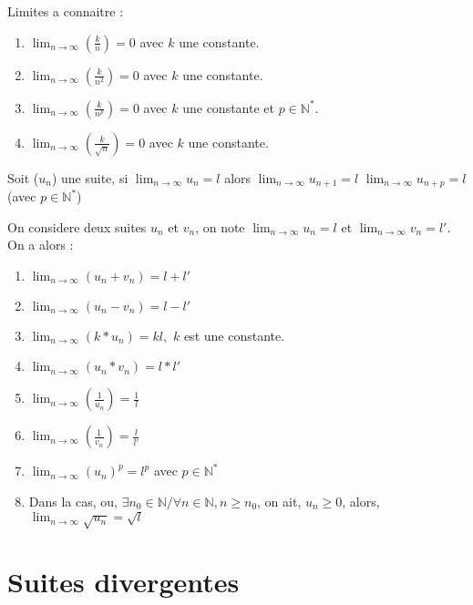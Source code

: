 \documentclass[a4paper,10pt]{book}
\begin{document}
	\begin{prop}
		Limites a connaitre : \\
		\begin{enumerate}
			\item $ \lim_{n \rightarrow \infty}(\frac{k}{n}) = 0$ avec $k$ une constante.
			\item $ \lim_{n \rightarrow \infty}(\frac{k}{n^2}) = 0$ avec $k$ une constante.
			\item $ \lim_{n \rightarrow \infty}(\frac{k}{n^p}) = 0$ avec $k$ une constante et $p \in \mathbb{N}^*$.
			\item $ \lim_{n \rightarrow \infty}(\frac{k}{\sqrt{n}}) = 0$ avec $k$ une constante.
		\end{enumerate}
	\end{prop}

	\begin{prop}
		Soit ($u_n$) une suite, si $\lim_{n \rightarrow \infty}u_n = l$ alors $\lim_{n \rightarrow \infty}u_{n+1} = l$ $\lim_{n \rightarrow \infty}u_{n+p} = l$ (avec $p \in \mathbb{N}^*$)
	\end{prop}

	\begin{prop} On considere deux suites $u_n$ et $v_n$, on note $\lim_{n \rightarrow \infty}u_n = l$ et $\lim_{n \rightarrow \infty}v_n = l'$. On a alors :
		\begin{enumerate}
			\item $\lim_{n \rightarrow \infty}(u_n + v_n) = l + l'$
			\item $\lim_{n \rightarrow \infty}(u_n - v_n) = l - l'$
			\item $\lim_{n \rightarrow \infty}(k*u_n) = kl,$ $k$ est une constante.
			\item $\lim_{n \rightarrow \infty}(u_n * v_n) = l * l'$
			\item $\lim_{n \rightarrow \infty}(\frac{1}{u_n}) = \frac{1}{l}$
			\item $\lim_{n \rightarrow \infty}(\frac{1}{v_n}) = \frac{l}{l'}$
			\item $\lim_{n \rightarrow \infty}(u_n)^p = l^p$ avec $p \in \mathbb{N}^*$
			\item Dans la cas, ou, $\exists n_0 \in \mathbb{N} / \forall n \in \mathbb{N}, n \geq n_0$, on ait, $u_n \geq 0$, alors, $\lim_{n \rightarrow \infty}\sqrt{u_n} = \sqrt{l}$
		\end{enumerate}
	\end{prop}

	\section{Suites divergentes}
	\label{sec:Suites divergentes}
\end{document}
